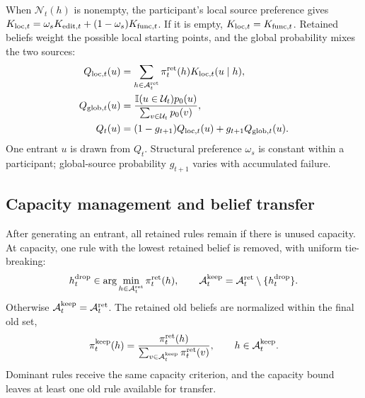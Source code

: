 When $\mathcal N_t(h)$ is nonempty, the participant's local source preference gives $K_{{\rm loc},t}=\omega_sK_{{\rm edit},t}+(1-\omega_s)K_{{\rm func},t}$. If it is empty, $K_{{\rm loc},t}=K_{{\rm func},t}$. Retained beliefs weight the possible local starting points, and the global probability mixes the two sources:
\begin{align}
Q_{{\rm loc},t}(u)&=\sum_{h\in\mathcal A_t^{\rm ret}}\pi_t^{\rm ret}(h)K_{{\rm loc},t}(u\mid h),\\
Q_{{\rm glob},t}(u)&=\frac{\mathbb I(u\in\mathcal U_t)p_0(u)}
{\sum_{v\in\mathcal U_t}p_0(v)},\\
Q_t(u)&=(1-g_{t+1})Q_{{\rm loc},t}(u)+g_{t+1}Q_{{\rm glob},t}(u).
\label{eq:combined-proposal}
\end{align}
One entrant $u$ is drawn from $Q_t$. Structural preference $\omega_s$ is constant within a participant; global-source probability $g_{t+1}$ varies with accumulated failure.

\subsection*{Capacity management and belief transfer}
\label{m:transfer}

After generating an entrant, all retained rules remain if there is unused capacity. At capacity, one rule with the lowest retained belief is removed, with uniform tie-breaking:
\begin{equation}
h_t^{\rm drop}\in\arg\min_{h\in\mathcal A_t^{\rm ret}}\pi_t^{\rm ret}(h),
\qquad
\mathcal A_t^{\rm keep}=\mathcal A_t^{\rm ret}\setminus\{h_t^{\rm drop}\}.
\label{eq:capacity-removal}
\end{equation}
Otherwise $\mathcal A_t^{\rm keep}=\mathcal A_t^{\rm ret}$. The retained old beliefs are normalized within the final old set,
\begin{equation}
\pi_t^{\rm keep}(h)=\frac{\pi_t^{\rm ret}(h)}
{\sum_{v\in\mathcal A_t^{\rm keep}}\pi_t^{\rm ret}(v)},
\qquad h\in\mathcal A_t^{\rm keep}.
\label{eq:pre-transfer-belief}
\end{equation}
Dominant rules receive the same capacity criterion, and the capacity bound leaves at least one old rule available for transfer.

